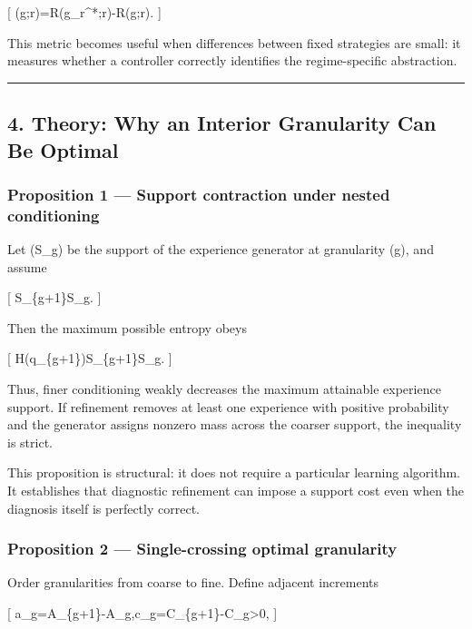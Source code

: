 \documentclass[
]{article}
\begin{document}
{[} (\hat g;r)=R(g\_r\^{}*;r)-R(\hat g;r). {]}

This metric becomes useful when differences between fixed strategies are
small: it measures whether a controller correctly identifies the
regime-specific abstraction.

\begin{center}\rule{0.5\linewidth}{0.5pt}\end{center}

\subsection{4. Theory: Why an Interior Granularity Can Be
Optimal}\label{theory-why-an-interior-granularity-can-be-optimal}

\subsubsection{Proposition 1 --- Support contraction under nested
conditioning}\label{proposition-1-support-contraction-under-nested-conditioning}

Let (S\_g) be the support of the experience generator at granularity
(g), and assume

{[} S\_\{g+1\}\subseteq S\_g. {]}

Then the maximum possible entropy obeys

{[}
H(q\_\{g+1\})\le \log\textbar S\_\{g+1\}\textbar{}\le \log\textbar S\_g\textbar.
{]}

Thus, finer conditioning weakly decreases the maximum attainable
experience support. If refinement removes at least one experience with
positive probability and the generator assigns nonzero mass across the
coarser support, the inequality is strict.

This proposition is structural: it does not require a particular
learning algorithm. It establishes that diagnostic refinement can impose
a support cost even when the diagnosis itself is perfectly correct.

\subsubsection{Proposition 2 --- Single-crossing optimal
granularity}\label{proposition-2-single-crossing-optimal-granularity}

Order granularities from coarse to fine. Define adjacent increments

{[} a\_g=A\_\{g+1\}-A\_g,\qquad c\_g=C\_\{g+1\}-C\_g\textgreater0, {]}
\end{document}
